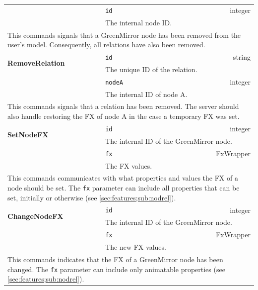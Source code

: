 \begin{longtable}{ |l|l r| }
   & \texttt{id} & integer 
\\ & \multicolumn{2}{|l|}{The internal node ID.} 
\\ \cline{2-3} \multicolumn{3}{|l|}{\parbox[t]{14.1cm}{\vspace{5px} This commands signals that a GreenMirror node has been removed from the user's model. Consequently, all relations have also been removed. \vspace{10px}}}
\\ \hline\hline \multirow{2}{*}{\textbf{RemoveRelation}}
   & \texttt{id} & string
\\ & \multicolumn{2}{|l|}{The unique ID of the relation.} 
\\ \cline{2-3} & \texttt{nodeA} & integer
\\ & \multicolumn{2}{|l|}{The internal ID of node A.} 
\\ \cline{2-3} \multicolumn{3}{|p{14.1cm}|}{\vspace{5px} This commands signals that a relation has been removed. The server should also handle restoring the FX of node A in the case a temporary FX was set. \vspace{10px}}
\\ \hline\hline \multirow{2}{*}{\textbf{SetNodeFX}}
   & \texttt{id} & integer
\\ & \multicolumn{2}{|l|}{The internal ID of the GreenMirror node.} 
\\ \cline{2-3} & \texttt{fx} & FxWrapper
\\ & \multicolumn{2}{|l|}{The FX values.} 
\\ \cline{2-3} \multicolumn{3}{|p{14.1cm}|}{\vspace{5px}This commands communicates with what properties and values the FX of a node should be set. The \texttt{fx} parameter can include all properties that can be set, initially or otherwise (see \cref{sec:features;sub:nodrel}).\vspace{10px}}
\\ \hline\hline \multirow{2}{*}{\textbf{ChangeNodeFX}}
   & \texttt{id} & integer
\\ & \multicolumn{2}{|l|}{The internal ID of the GreenMirror node.} 
\\ \cline{2-3} & \texttt{fx} & FxWrapper
\\ & \multicolumn{2}{|l|}{The new FX values.} 
\\ \cline{2-3} \multicolumn{3}{|p{14.1cm}|}{\vspace{5px} This commands indicates that the FX of a GreenMirror node has been changed. The \texttt{fx} parameter can include only animatable properties (see \cref{sec:features;sub:nodrel}). \vspace{10px}}
\\\hline\end{longtable}
